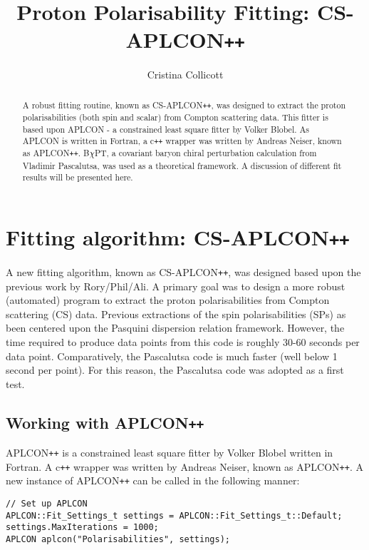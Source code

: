\documentclass[]{article}
\title{Proton Polarisability Fitting: CS-APLCON\texttt{++} }
\author{Cristina Collicott}
\begin{document}
	
\maketitle

\begin{abstract}
	A robust fitting routine, known as CS-APLCON\texttt{++}, was designed to extract the proton polarisabilities (both spin and scalar) from Compton scattering data. This fitter is based upon APLCON - a constrained least square fitter by Volker Blobel. As APLCON is written in Fortran, a c\texttt{++} wrapper was written by Andreas Neiser, known as APLCON\texttt{++}. B$\chi$PT, a covariant baryon chiral perturbation calculation from Vladimir Pascalutsa, was used as a theoretical framework. A discussion of different fit results will be presented here. \vspace{8mm}
\end{abstract}

\section{Fitting algorithm: CS-APLCON\texttt{++}}

A new fitting algorithm, known as CS-APLCON\texttt{++}, was designed based upon the previous work by Rory/Phil/Ali. A primary goal was to design a more robust (automated) program to extract the proton polarisabilities from Compton scattering (CS) data. Previous extractions of the spin polarisabilities (SPs) as been centered upon the Pasquini dispersion relation framework. However, the time required to produce data points from this code is roughly 30-60 seconds per data point. Comparatively, the Pascalutsa code is much faster (well below 1 second per point). For this reason, the Pascalutsa code was adopted as a first test.

\subsection{Working with APLCON\texttt{++}}

APLCON\texttt{++} is a constrained least square fitter by Volker Blobel written in Fortran. A c\texttt{++} wrapper was written by Andreas Neiser, known as APLCON\texttt{++}. A new instance of APLCON\texttt{++} can be called in the following manner: \\

\begin{lstlisting}
// Set up APLCON
APLCON::Fit_Settings_t settings = APLCON::Fit_Settings_t::Default;
settings.MaxIterations = 1000;
APLCON aplcon("Polarisabilities", settings);
\end{lstlisting}
\end{document}
